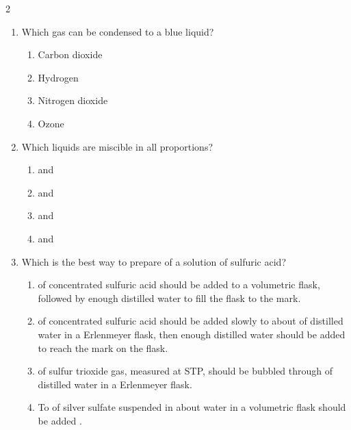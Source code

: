 \documentclass[10pt,letterpaper]{article}
\begin{document}
\begin{multicols*}{2}
\begin{enumerate}
    \item Which gas can be condensed to a blue liquid?
    \begin{enumerate}[label=(\textsubscript{\Alph*})]
        \item Carbon dioxide
        \item Hydrogen
        \item Nitrogen dioxide
        \item Ozone
    \end{enumerate}

    \item Which liquids are miscible in all proportions?
    \begin{enumerate}[label=(\textsubscript{\Alph*})]
        \item {} and 
        \item {} and 
        \item {} and 
        \item {} and 
    \end{enumerate}

    \item Which is the best way to prepare  of a  solution of sulfuric acid?
    \begin{enumerate}[label=(\textsubscript{\Alph*})]
        \item {} of concentrated sulfuric acid should be added to a  volumetric flask, followed by enough distilled water to fill the flask to the mark.
        \item {} of concentrated sulfuric acid should be added slowly to about  of distilled water in a  Erlenmeyer flask, then enough distilled water should be added to reach the  mark on the flask.
        \item {} of sulfur trioxide gas, measured at STP, should be bubbled through  of distilled water in a  Erlenmeyer flask.
        \item To  of silver sulfate suspended in about  water in a  volumetric flask should be added  .
    \end{enumerate}


\end{enumerate}
\end{multicols*}
\end{document}
